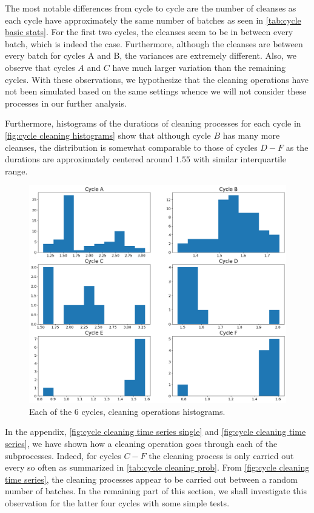 \documentclass[../Thesis.tex]{subfiles}
\begin{document}
The most notable differences from cycle to cycle are the number of cleanses as each cycle have approximately the same number of batches as seen in \autoref{tab:cycle basic stats}. For the first two cycles, the cleanses seem to be in between every batch, which is indeed the case. Furthermore, although the cleanses are between every batch for cycles A and B, the variances are extremely different. Also, we observe that cycles $A$ and $C$ have much larger variation than the remaining cycles. With these observations, we hypothesize that the cleaning operations have not been simulated based on the same settings whence we will not consider these processes in our further analysis.

Furthermore, histograms of the durations of cleaning processes for each cycle in \autoref{fig:cycle cleaning histograms} show that although cycle $B$ has many more cleanses, the distribution is somewhat comparable to those of cycles $D-F$ as the durations are approximately centered around $1.55$ with similar interquartile range.

\begin{figure}[ht]
    \centering
    \includegraphics[width=0.8\linewidth]{figures/Multiple cycles data/Cleaning batches histograms.png}
    \caption{Each of the 6 cycles, cleaning operations histograms.}
    \label{fig:cycle cleaning histograms}
\end{figure}

In the appendix, \autoref{fig:cycle cleaning time series single} and \autoref{fig:cycle cleaning time series}, we have shown how a cleaning operation goes through each of the subprocesses. Indeed, for cycles $C-F$ the cleaning process is only carried out every so often as summarized in \autoref{tab:cycle cleaning prob}. From \autoref{fig:cycle cleaning time series}, the cleaning processes appear to be carried out between a random number of batches. In the remaining part of this section, we shall investigate this observation for the latter four cycles with some simple tests.
\end{document}

